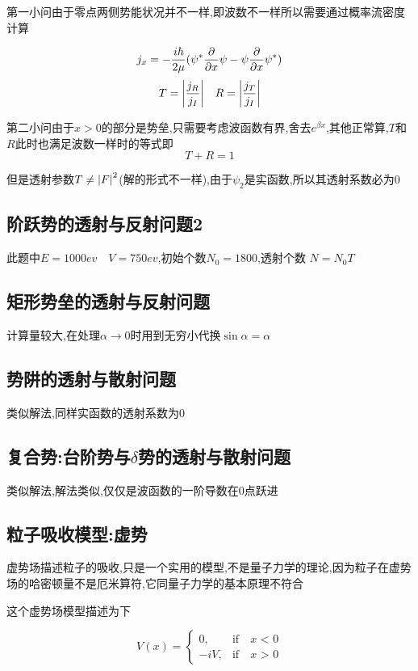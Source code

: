 \documentclass{article}
\begin{document}
            第一小问由于零点两侧势能状况并不一样,即波数不一样所以需要通过概率流密度计算

            $$ j_{x} = -\frac{i\hbar}{2\mu} (\psi^{*} \pdv{}{x} \psi - \psi \pdv{}{x} \psi^{*} ) $$
            $$ T = \abs{\frac{j_{R}}{j_{I}}} \quad R = \abs{\frac{j_{T}}{j_{I}}} $$

            第二小问由于$x>0$的部分是势垒,只需要考虑波函数有界,舍去$e^{\beta x}$,其他正常算,$T$和$R$此时也满足波数一样时的等式即
            $$ T + R = 1  $$
            
            但是透射参数$T \neq \abs{F}^{2}$(解的形式不一样),由于$\psi_{2}$是实函数,所以其透射系数必为0
            
            
        \subsection{阶跃势的透射与反射问题2}
            此题中$ E = 1000ev \quad V = 750ev $,初始个数$ N_{0} = 1800 $,透射个数 $ N = N_{0} T $

        \subsection{矩形势垒的透射与反射问题}
            计算量较大,在处理$ \alpha \to 0 $时用到无穷小代换$ \sin{\alpha} = \alpha $

        \subsection{势阱的透射与散射问题}
            类似解法,同样实函数的透射系数为0
        
        \subsection{复合势:台阶势与\texorpdfstring{$\delta$}{}势的透射与散射问题}
            类似解法,解法类似,仅仅是波函数的一阶导数在0点跃进

        
        \subsection{粒子吸收模型:虚势}
            虚势场描述粒子的吸收,只是一个实用的模型,不是量子力学的理论,因为粒子在虚势场的哈密顿量不是厄米算符,它同量子力学的基本原理不符合

            这个虚势场模型描述为下

            $$ V(x) =
            \begin{cases}
            0, & \mbox{if} \quad x \mbox{ < 0} \\
            -iV , & \mbox{if} \quad x \mbox{ > 0}
            \end{cases}  $$
\end{document}
